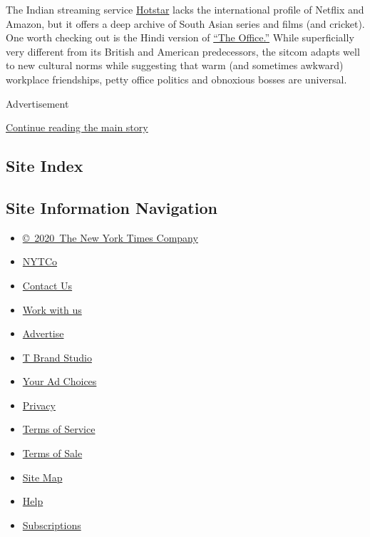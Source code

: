 The Indian streaming service
\href{https://www.hotstar.com/us/subscribe/get-started}{Hotstar} lacks
the international profile of Netflix and Amazon, but it offers a deep
archive of South Asian series and films (and cricket). One worth
checking out is the Hindi version of
\href{https://www.youtube.com/watch?v=rdqZFIOhes8}{``The Office.''}
While superficially very different from its British and American
predecessors, the sitcom adapts well to new cultural norms while
suggesting that warm (and sometimes awkward) workplace friendships,
petty office politics and obnoxious bosses are universal.

Advertisement

\protect\hyperlink{after-bottom}{Continue reading the main story}

\hypertarget{site-index}{%
\subsection{Site Index}\label{site-index}}

\hypertarget{site-information-navigation}{%
\subsection{Site Information
Navigation}\label{site-information-navigation}}

\begin{itemize}
\tightlist
\item
  \href{https://help.nytimes.com/hc/en-us/articles/115014792127-Copyright-notice}{©~2020~The
  New York Times Company}
\end{itemize}

\begin{itemize}
\tightlist
\item
  \href{https://www.nytco.com/}{NYTCo}
\item
  \href{https://help.nytimes.com/hc/en-us/articles/115015385887-Contact-Us}{Contact
  Us}
\item
  \href{https://www.nytco.com/careers/}{Work with us}
\item
  \href{https://nytmediakit.com/}{Advertise}
\item
  \href{http://www.tbrandstudio.com/}{T Brand Studio}
\item
  \href{https://www.nytimes.com/privacy/cookie-policy\#how-do-i-manage-trackers}{Your
  Ad Choices}
\item
  \href{https://www.nytimes.com/privacy}{Privacy}
\item
  \href{https://help.nytimes.com/hc/en-us/articles/115014893428-Terms-of-service}{Terms
  of Service}
\item
  \href{https://help.nytimes.com/hc/en-us/articles/115014893968-Terms-of-sale}{Terms
  of Sale}
\item
  \href{https://spiderbites.nytimes.com}{Site Map}
\item
  \href{https://help.nytimes.com/hc/en-us}{Help}
\item
  \href{https://www.nytimes.com/subscription?campaignId=37WXW}{Subscriptions}
\end{itemize}
